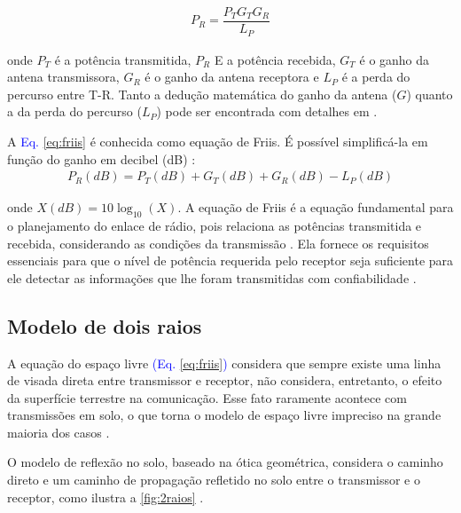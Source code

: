 \begin{equation}
	\begin{aligned}
	\label{eq:friis}
		P_R = \dfrac{P_TG_TG_R}{L_P}
	\end{aligned}
\end{equation}

\noindent onde $P_T$ é a potência transmitida, $P_R$ E a potência recebida, $G_T$ é o ganho da antena transmissora, $G_R$ é o ganho da antena receptora e $L_P$ é a perda do percurso entre T-R. Tanto a dedução matemática do ganho da antena ($G$) quanto a da perda do percurso ($L_P$) pode ser encontrada com detalhes em .

A \textcolor{blue}{Eq. \eqref{eq:friis}} é conhecida como equação de Friis. É possível simplificá-la em função do ganho em decibel (dB) \cite{haykin2008}:
\begin{equation}
	\begin{aligned}
	\label{eq:friis-decibel}
		P_R(dB) = P_T(dB) + G_T(dB) + G_R(dB) - L_P(dB)
	\end{aligned}
\end{equation}

\noindent onde $X(dB) = 10\log_{10} (X)$. A equação de Friis é a equação fundamental para o planejamento do enlace de rádio, pois relaciona as potências transmitida e recebida, considerando as condições da transmissão \cite{haykin2008}. Ela fornece os requisitos essenciais para que o nível de potência requerida pelo receptor seja suficiente para ele detectar as informações que lhe foram transmitidas com confiabilidade \cite{haykin2008}.

\subsection{Modelo de dois raios}
\label{sub:modelo-2-raios}

A equação do espaço livre \textcolor{blue}{(Eq. \eqref{eq:friis})} considera que sempre existe uma linha de visada direta entre transmissor e receptor, não considera, entretanto, o efeito da superfície terrestre na comunicação. Esse fato raramente acontece com transmissões em solo, o que torna o modelo de espaço livre impreciso na grande maioria dos casos \cite{rappaport2009}.

O modelo de reflexão no solo, baseado na ótica geométrica, considera o caminho direto e um caminho de propagação refletido no solo entre o transmissor e o receptor, como ilustra a \autoref{fig:2raios} \cite{rappaport2009}.

